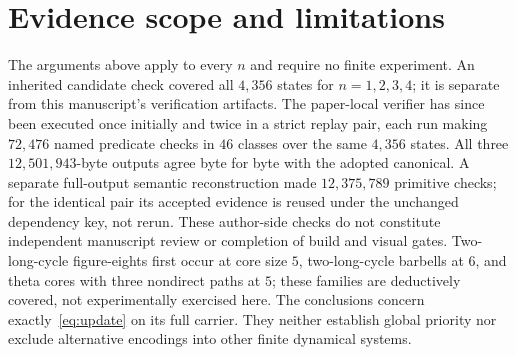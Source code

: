 \section{Evidence scope and limitations}
The arguments above apply to every $n$ and require no finite experiment.
An inherited candidate check covered all $4{,}356$ states for $n=1,2,3,4$;
it is separate from this manuscript's verification artifacts.
The paper-local verifier has since been executed once initially and twice
in a strict replay pair, each run making $72{,}476$ named predicate checks
in $46$ classes over the same $4{,}356$ states.
All three $12{,}501{,}943$-byte outputs agree byte for byte with the adopted
canonical. A separate full-output semantic reconstruction made
$12{,}375{,}789$ primitive checks; for the identical pair its accepted evidence
is reused under the unchanged dependency key, not rerun.
These author-side checks do not constitute independent manuscript review
or completion of build and visual gates.
Two-long-cycle figure-eights first occur at core size $5$, two-long-cycle
barbells at $6$, and theta cores with three nondirect paths at $5$; these
families are deductively covered, not experimentally exercised here.
The conclusions concern exactly~\eqref{eq:update} on its full carrier.
They neither establish global priority nor exclude alternative encodings
into other finite dynamical systems.
